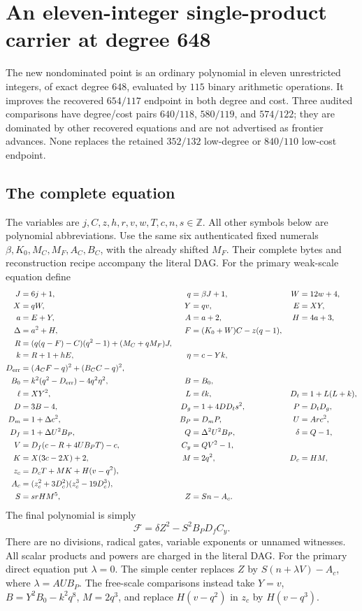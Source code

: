 \section[Eleven integers with an amplified product carrier]{An eleven-integer single-product carrier at degree 648}
\label{sec:integer-product}
The new nondominated point is an ordinary polynomial in eleven unrestricted
integers, of exact degree \(648\), evaluated by \(115\) binary arithmetic
operations. It improves the recovered \(654/117\) endpoint in both degree and
cost. Three audited comparisons have degree/cost pairs \(640/118\),
\(580/119\), and \(574/122\); they are dominated by other recovered equations
and are not advertised as frontier advances. None replaces the retained
\(352/132\) low-degree or \(840/110\) low-cost endpoint.

\subsection{The complete equation}
The variables are \(j,C,z,h,r,v,w,T,c,n,s\in\mathbb Z\). All other symbols
below are polynomial abbreviations. Use the same six authenticated fixed
numerals \(\beta,K_0,M_C,M_F,A_C,B_C\), with the already shifted \(M_F\).
Their complete bytes and reconstruction recipe accompany the literal DAG.
For the primary weak-scale equation define
\begin{align*}
 J&=6j+1,&q&=\beta J+1,&W&=12w+4,\\
 X&=qW,&Y&=qv,&E&=XY,\\
 a&=E+Y,&A&=a+2,&H&=4a+3,\\
 \Delta&=a^2+H,&F&=(K_0+W)C-z(q-1),\\
 R&=(q(q-F)-C)(q^2-1)+(M_C+qM_F)J,\\
 k&=R+1+hE,&\eta&=c-Yk,\\
 D_{\rm err}&=(A_CF-q)^2+(B_CC-q)^2,\\
 B_0&=k^2(q^2-D_{\rm err})-4q^2\eta^2,&B&=B_0,\\
 \ell&=XY^2,&L&=\ell k,&D_t&=1+L(L+k),\\
 D&=3B-4,&D_g&=1+4DD_ts^2,&P&=D_tD_g,\\
 D_m&=1+\Delta c^2,&B_P&=D_mP,&U&=Arc^2,\\
 D_f&=1+\Delta U^2B_P,&Q&=\Delta^2U^2B_P,&\delta&=Q-1,\\
 V&=D_f(c-R+4UB_PT)-c,&C_y&=QV^2-1,\\
 K&=X(3c-2X)+2,&M&=2q^2,&D_c&=HM,\\
 z_c&=D_cT+MK+H(v-q^2),\\
 A_c&=(z_c^2+3D_c^2)(z_c^3-19D_c^3),\\
 S&=srHM^5,&Z&=Sn-A_c.
\end{align*}
The final polynomial is simply
\[
 \boxed{\mathcal F=\delta Z^2-S^2B_PD_fC_y.}
\]
There are no divisions, radical gates, variable exponents or unnamed
witnesses. All scalar products and powers are charged in the literal DAG.
For the primary direct equation put $\lambda=0$. The simple center replaces \(Z\) by \(S(n+\lambda V)-A_c\), where
\(\lambda=AUB_P\). The free-scale comparisons instead take
\(Y=v\), \(B=Y^2B_0-k^2q^8\), \(M=2q^3\), and replace
\(H(v-q^2)\) in \(z_c\) by \(H(v-q^3)\).

